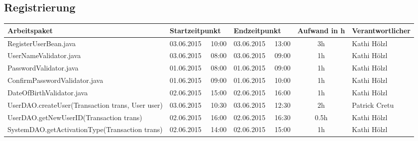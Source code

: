 \begin{landscape}
\subsection{Registrierung}
\begin{tabular}{|p{10.3cm}|p{3.2cm}|p{3.2cm}|c|p{3.5cm}|}
	\hline  \textbf{Arbeitspaket} & \textbf{Startzeitpunkt} & \textbf{Endzeitpunkt} & \textbf{Aufwand in h} & \textbf{Verantwortlicher} \\ 
	\hline   RegisterUserBean.java                                & 03.06.2015 \ \ 10:00     & 03.06.2015 \ \ 13:00     &      3h               & Kathi Hölzl\\
	\hline   UserNameValidator.java                               & 03.06.2015 \ \ 08:00     & 03.06.2015 \ \ 09:00     &      1h               & Kathi Hölzl\\
	\hline   PasswordValidator.java                               & 01.06.2015 \ \ 08:00     & 01.06.2015 \ \ 09:00     &      1h               & Kathi Hölzl\\
	\hline   ConfirmPasswordValidator.java                        & 01.06.2015 \ \ 09:00     & 01.06.2015 \ \ 10:00     &      1h               & Kathi Hölzl\\
	\hline   DateOfBirthValidator.java                            & 02.06.2015 \ \ 15:00     & 02.06.2015 \ \ 16:00     &      1h               & Kathi Hölzl\\
	\hline   UserDAO.createUser(Transaction trans, User user)     & 03.06.2015 \ \ 10:30     & 03.06.2015 \ \ 12:30     &      2h               & Patrick Cretu\\
	\hline   UserDAO.getNewUserID(Transaction trans)              & 02.06.2015 \ \ 16:00     & 02.06.2015 \ \ 16:30     &      0.5h             & Kathi Hölzl\\
	\hline   SystemDAO.getActivationType(Transaction trans)       & 02.06.2015 \ \ 14:00     & 02.06.2015 \ \ 15:00     &      1h               & Kathi Hölzl\\
	\hline 
\end{tabular} \ \\
\ \\


\end{landscape}
